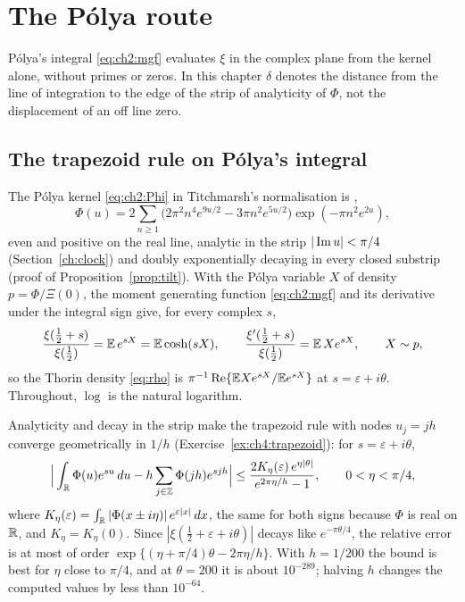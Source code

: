 \section{The P\'olya route}\label{ch:polya}

P\'olya's integral \eqref{eq:ch2:mgf} evaluates $\xi$ in the complex plane from the kernel alone, without primes or zeros. In this chapter $\delta$ denotes the distance from the line of integration to the edge of the strip of analyticity of $\Phi$, not the displacement of an off line zero.

\subsection{The trapezoid rule on P\'olya's integral}\label{sec:ch4:trapezoid}

The P\'olya kernel \eqref{eq:ch2:Phi} in Titchmarsh's normalisation is \cite[Section 10.1]{Titchmarsh},
\begin{equation}\label{eq:Phi}
\Phi(u)=2\sum_{n\ge1}\big(2\pi^2n^4e^{9u/2}-3\pi n^2e^{5u/2}\big)\exp(-\pi n^2e^{2u}),
\end{equation}
even and positive on the real line, analytic in the strip $|\operatorname{Im} u|<\pi/4$ (Section~\ref{ch:clock}) and doubly exponentially decaying in every closed substrip (proof of Proposition~\ref{prop:tilt}). With the P\'olya variable $X$ of density $p=\Phi/\Xi(0)$, the moment generating function \eqref{eq:ch2:mgf} and its derivative under the integral sign give, for every complex $s$,
\begin{equation}\label{eq:xi}
\frac{\xi(\tfrac12+s)}{\xi(\tfrac12)}=\mathbb{E}\,e^{sX}=\mathbb{E}\cosh(sX),\qquad \frac{\xi'(\tfrac12+s)}{\xi(\tfrac12)}=\mathbb{E}\,Xe^{sX},\qquad X\sim p,
\end{equation}
so the Thorin density \eqref{eq:rho} is $\pi^{-1}\operatorname{Re}\{\mathbb{E} Xe^{sX}/\mathbb{E} e^{sX}\}$ at $s=\varepsilon+i\theta$. Throughout, $\log$ is the natural logarithm.

Analyticity and decay in the strip make the trapezoid rule with nodes $u_j=jh$ converge geometrically in $1/h$ \cite[Theorem 5.1]{TW14} (Exercise~\ref{ex:ch4:trapezoid}): for $s=\varepsilon+i\theta$,
\[
\Big|\int_{\mathbb{R}}\Phi(u)e^{su}\,du-h\sum_{j\in\mathbb Z}\Phi(jh)e^{sjh}\Big|\le \frac{2K_\eta(\varepsilon)\,e^{\eta|\theta|}}{e^{2\pi\eta/h}-1},\qquad 0<\eta<\pi/4,
\]
where $K_\eta(\varepsilon)=\int_{\mathbb{R}}|\Phi(x\pm i\eta)|\,e^{\varepsilon|x|}\,dx$, the same for both signs because $\Phi$ is real on $\mathbb{R}$, and $K_\eta=K_\eta(0)$. Since $|\xi(\tfrac12+\varepsilon+i\theta)|$ decays like $e^{-\pi\theta/4}$, the relative error is at most of order $\exp\{(\eta+\pi/4)\theta-2\pi\eta/h\}$. With $h=1/200$ the bound is best for $\eta$ close to $\pi/4$, and at $\theta=200$ it is about $10^{-289}$; halving $h$ changes the computed values by less than $10^{-64}$.

